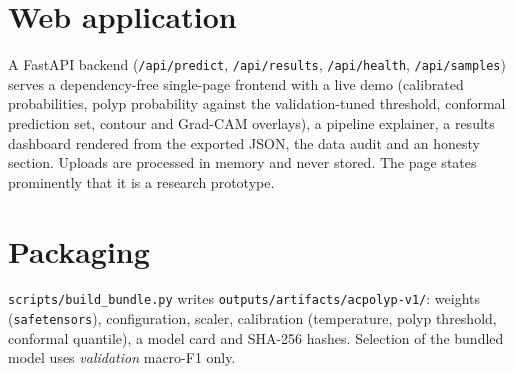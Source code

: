 \section{Web application}
A FastAPI backend (\texttt{/api/predict}, \texttt{/api/results}, \texttt{/api/health}, \texttt{/api/samples}) serves a dependency-free single-page frontend with a live demo
(calibrated probabilities, polyp probability against the validation-tuned threshold, conformal prediction set, contour and Grad-CAM overlays), a pipeline explainer,
a results dashboard rendered from the exported JSON, the data audit and an honesty section. Uploads are processed in memory and never stored. The page states
prominently that it is a research prototype.

\section{Packaging}
\texttt{scripts/build\_bundle.py} writes \texttt{outputs/artifacts/acpolyp-v1/}: weights (\texttt{safetensors}), configuration, scaler, calibration
(temperature, polyp threshold, conformal quantile), a model card and SHA-256 hashes. Selection of the bundled model uses \emph{validation} macro-F1 only.
